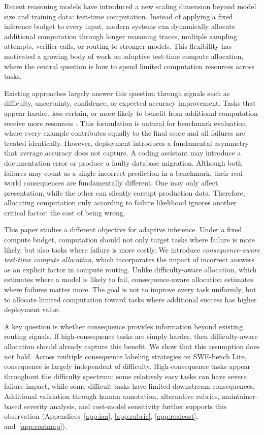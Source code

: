 \documentclass{article}
\begin{document}
Recent reasoning models have introduced a new scaling dimension beyond
model size and training data: test-time computation. Instead of applying
a fixed inference budget to every input, modern systems can dynamically
allocate additional computation through longer reasoning traces,
multiple sampling attempts, verifier calls, or routing to stronger
models. This flexibility has motivated a growing body of work on
adaptive test-time compute allocation, where the central question is how
to spend limited computation resources across tasks.

Existing approaches largely answer this question through signals such as
difficulty, uncertainty, confidence, or expected accuracy improvement.
Tasks that appear harder, less certain, or more likely to benefit from
additional computation receive more resources
\citep{snell2024scaling,damani2024learning,manvi2024adaptive,
qu2026adaptivetesttime}. This formulation is natural for benchmark
evaluation, where every example contributes equally to the final score
and all failures are treated identically. However, deployment introduces
a fundamental asymmetry that average accuracy does not capture.
A coding assistant may introduce a documentation error or produce a
faulty database migration. Although both failures may count as a single
incorrect prediction in a benchmark, their real-world consequences are
fundamentally different. One may only affect presentation, while the
other can silently corrupt production data. Therefore, allocating
computation only according to failure likelihood ignores another
critical factor: the cost of being wrong.

This paper studies a different objective for adaptive inference. Under a
fixed compute budget, computation should not only target tasks where
failure is more likely, but also tasks where failure is more costly. We
introduce \emph{consequence-aware test-time compute allocation}, which
incorporates the impact of incorrect answers as an explicit factor in
compute routing. Unlike difficulty-aware allocation, which estimates
where a model is likely to fail, consequence-aware allocation estimates
where failures matter more. The goal is not to improve every task
uniformly, but to allocate limited computation toward tasks where
additional success has higher deployment value.

A key question is whether consequence provides information beyond
existing routing signals. If high-consequence tasks are simply harder,
then difficulty-aware allocation should already capture this benefit.
We show that this assumption does not hold. Across multiple consequence
labeling strategies on SWE-bench Lite, consequence is largely
independent of difficulty. High-consequence tasks appear throughout the
difficulty spectrum: some relatively easy tasks can have severe failure
impact, while some difficult tasks have limited downstream consequences.
Additional validation through human annotation, alternative rubrics,
maintainer-based severity analysis, and cost-model sensitivity further
supports this observation
(Appendices~\ref{app:iaa}, \ref{app:rubric},
\ref{app:realcost}, and~\ref{app:costmap}).
\end{document}
